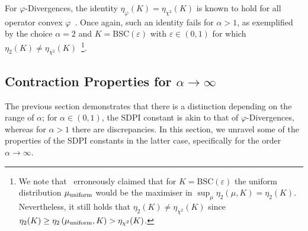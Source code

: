\documentclass[conference,letterpaper]{IEEEtran}
\begin{document}
For $\varphi$-Divergences, the identity ${\eta_\varphi(K)=\eta_{\chi^2}(K)}$ is known to hold for all operator convex $\varphi$~\cite[Corollary III.1]{raginsky2016strong}. Once again, such an identity fails for $\alpha>1$, as exemplified by the choice $\alpha=2$ and $K=\mathrm{BSC}(\varepsilon)$ with $\varepsilon\in(0,1)$ for which $\eta_2(K)\neq\eta_{\chi^2}(K)$~\cite[Corollary 6]{jin2024properties}\footnote{We note that~\cite[Corollary 6]{jin2024properties} erroneously claimed that for ${K=\mathrm{BSC}(\varepsilon)}$ the uniform distribution $\mu_{\rm uniform}$ would be the maximiser in $\sup_\mu\eta_2(\mu, K)=\eta_2(K)$. Nevertheless, it still holds that $\eta_2(K)\neq\eta_{\chi^2}(K)$ since ${\eta_2(K)\geq \eta_2\left(\mu_{\rm uniform}, K\right)>\eta_{\chi^2}(K)}$.}.
\subsection{Contraction Properties for $\alpha\to\infty$}\noindent
The previous section demonstrates that there is a distinction depending on the range of $\alpha$; for $\alpha\in(0,1)$, the SDPI constant is akin to that of $\varphi$-Divergences, whereas for $\alpha>1$ there are discrepancies. In this section, we unravel some of the properties of the SDPI constants in the latter case, specifically for the order $\alpha\to\infty$.
\end{document}
